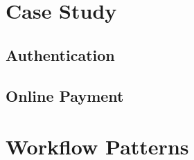 \section{Case Study}

\subsection{Authentication}

\subsection{Online Payment}

\section{Workflow Patterns}
